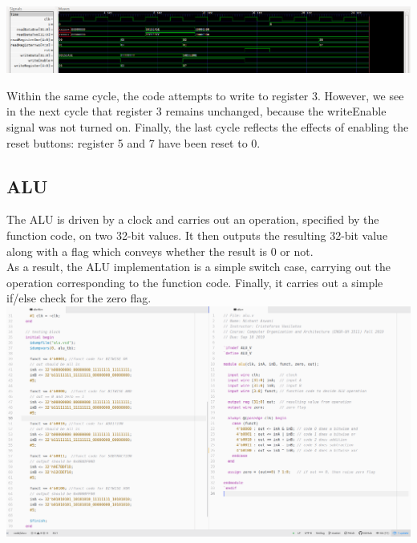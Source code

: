 \documentclass[twocolumn]{article}
\begin{document}
\begingroup
    \centering
    \medskip
    \includegraphics[width=\columnwidth]{Lab-Tex/Lab3-images/register-file-wave.png}
    \medskip
\endgroup
\medskip

Within the same cycle, the code attempts to write to register 3. However, we see in the next cycle that register 3 remains unchanged, because the writeEnable signal was not turned on. Finally, the last cycle reflects the effects of enabling the reset buttons: register 5 and 7 have been reset to 0. 

\subsection{ALU}

The ALU is driven by a clock and carries out an operation, specified by the function code, on two 32-bit values. It then outputs the resulting 32-bit value along with a flag which conveys whether the result is 0 or not. \\

As a result, the ALU implementation is a simple switch case, carrying out the operation corresponding to the function code. Finally, it carries out a simple if/else check for the zero flag. \\

\begingroup
    \centering
    \medskip
    \includegraphics[width=\columnwidth]{Lab-Tex/Lab3-images/alu.png}
    \medskip
\endgroup
\medskip
\\
\end{document}

